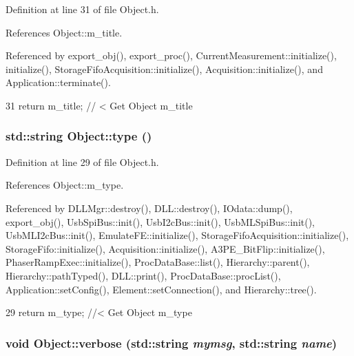 Definition at line 31 of file Object.h.

References Object::m\_\-title.

Referenced by export\_\-obj(), export\_\-proc(), CurrentMeasurement::initialize(), initialize(), StorageFifoAcquisition::initialize(), Acquisition::initialize(), and Application::terminate().


\begin{DoxyCode}
31 { return m_title;      } // < Get Object m_title
\end{DoxyCode}
\hypertarget{classObject_a84f99f70f144a83e1582d1d0f84e4e62}{
\subsubsection[{type}]{\setlength{\rightskip}{0pt plus 5cm}std::string Object::type ()}}
\label{classObject_a84f99f70f144a83e1582d1d0f84e4e62}


Definition at line 29 of file Object.h.

References Object::m\_\-type.

Referenced by DLLMgr::destroy(), DLL::destroy(), IOdata::dump(), export\_\-obj(), UsbSpiBus::init(), UsbI2cBus::init(), UsbMLSpiBus::init(), UsbMLI2cBus::init(), EmulateFE::initialize(), StorageFifoAcquisition::initialize(), StorageFifo::initialize(), Acquisition::initialize(), A3PE\_\-BitFlip::initialize(), PhaserRampExec::initialize(), ProcDataBase::list(), Hierarchy::parent(), Hierarchy::pathTyped(), DLL::print(), ProcDataBase::procList(), Application::setConfig(), Element::setConnection(), and Hierarchy::tree().


\begin{DoxyCode}
29 { return m_type;       } //< Get Object m_type
\end{DoxyCode}
\hypertarget{classObject_a2d4120195317e2a3c6532e8bb9f3da68}{
\subsubsection[{verbose}]{\setlength{\rightskip}{0pt plus 5cm}void Object::verbose (std::string {\em mymsg}, \/  std::string {\em name})}}
\label{classObject_a2d4120195317e2a3c6532e8bb9f3da68}


